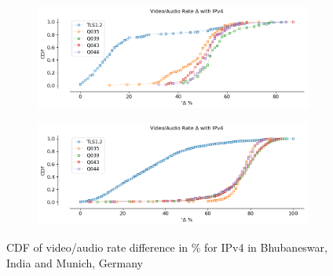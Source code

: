 \begin{frame}

\begin{figure}[!htb]
    
    \begin{subfigure}{0.5\textwidth}
        \includegraphics[width=\linewidth]{./plots/youtube/india/graph_rate_diff.png}
    \end{subfigure}
    \begin{subfigure}{0.5\textwidth}
        \includegraphics[width=\linewidth]{./plots/youtube/munich/graph_rate_diff.png}
    \end{subfigure}    
    \caption{CDF of video/audio rate difference in \% for IPv4 in Bhubaneswar, India and Munich, Germany}\label{fig:cdf-of-video-audio}
\end{figure}

\end{frame}
\clearpage

